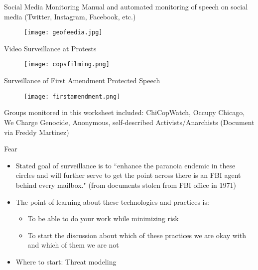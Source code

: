 \documentclass[newPxFont]{beamer}
\begin{document}
\begin{frame}{Social Media Monitoring}
Manual and automated monitoring of speech on social media (Twitter, Instagram, Facebook, etc.)
\begin{figure}
\centering
\texttt{[image: geofeedia.jpg]}
\end{figure}
\end{frame}

\begin{frame}{Video Surveillance at Protests}
        \begin{figure}
                \centering
                \texttt{[image: copsfilming.png]}
        \end{figure}
\end{frame}

\begin{frame}{Surveillance of First Amendment Protected Speech}
        \begin{figure}
                \centering
                \texttt{[image: firstamendment.png]}
        \end{figure}
Groups monitored in this worksheet included: ChiCopWatch, Occupy Chicago, We Charge Genocide, Anonymous, self-described Activists/Anarchists (Document via Freddy Martinez)
\end{frame}

\begin{frame}{Fear}
\begin{itemize}
\item<1-> Stated goal of surveillance is to ``enhance the paranoia endemic in these circles and will further serve to get the point across there is an FBI agent behind every mailbox." (from documents stolen from FBI office in 1971)
\item<2-> The point of learning about these technologies and practices is:
\begin{itemize} \item To be able to do your work while minimizing risk 
 \item To start the discussion about which of these practices we are okay with and which of them we are not
\end{itemize} 
\item<3-> Where to start: Threat modeling 
\end{itemize}
\end{frame}
\end{document}
